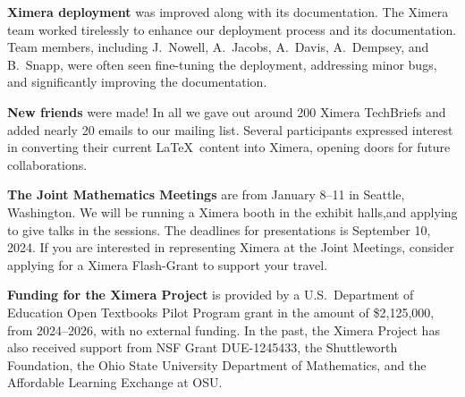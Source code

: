 \documentclass{techbrief}
\begin{document}
\begin{xframe}
    \textbf{Ximera deployment} was improved along with its documentation. The
    Ximera team worked tirelessly to enhance our deployment process and its
    documentation. Team members, including J.\ Nowell, A.\ Jacobs, A.\ Davis,
    A.\ Dempsey, and B.\ Snapp, were often seen fine-tuning the deployment,
    addressing minor bugs, and significantly improving the documentation.
\end{xframe}

\begin{xframe}
    \textbf{New friends} were made! In all we gave out around 200 Ximera
    TechBriefs and added nearly 20 emails to our mailing list.	Several
    participants expressed interest in converting their current \LaTeX\ content
    into Ximera, opening doors for future collaborations.
\end{xframe}

\begin{xframe}
    {\sffamily\bfseries The Joint Mathematics Meetings} are from January 8--11
    in Seattle, Washington. We will be running a Ximera booth in the exhibit
    halls,and applying to give talks in the sessions. The deadlines for
    presentations is September 10, 2024. If you are interested in representing Ximera at the
    Joint Meetings, consider applying for a Ximera Flash-Grant to support your
    travel.
\end{xframe}

\begin{xframe}
    \textbf{Funding for the Ximera Project} is provided by
    a U.S.\ Department of Education Open Textbooks Pilot Program grant in the
    amount of \$2,125,000, from 2024--2026, with no external funding. In the
    past, the Ximera Project has
    also received support from NSF Grant DUE-1245433, the Shuttleworth
    Foundation, the Ohio State University
    Department of Mathematics, and the Affordable Learning Exchange at OSU.
\end{xframe}
\end{document}
